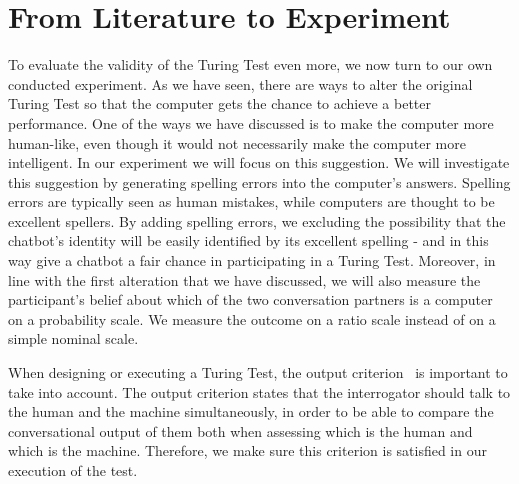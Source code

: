 \section{From Literature to Experiment}
To evaluate the validity of the Turing Test even more, we now turn to our own conducted experiment. As we have seen, there are ways to alter the original Turing Test so that the computer gets the chance to achieve a better performance. One of the ways we have discussed is to make the computer more human-like, even though it would not necessarily make the computer more intelligent. In our experiment we will focus on this suggestion. We will investigate this suggestion by generating spelling errors into the computer’s answers. Spelling errors are typically seen as human mistakes, while computers are thought to be excellent spellers. By adding spelling errors, we excluding the possibility that the chatbot’s identity will be easily identified by its excellent spelling - and in this way give a chatbot a fair chance in participating in a Turing Test. Moreover, in line with the first alteration that we have discussed, we will also measure the participant’s belief about which of the two conversation partners is a computer on a probability scale. We measure the outcome on a ratio scale instead of on a simple nominal scale.

When designing or executing a Turing Test, the output criterion~\cite{copeland2014eugene} is important to take into account. The output criterion states that the interrogator should talk to the human and the machine simultaneously, in order to be able to compare the conversational output of them both when assessing which is the human and which is the machine. Therefore, we make sure this criterion is satisfied in our execution of the test.

